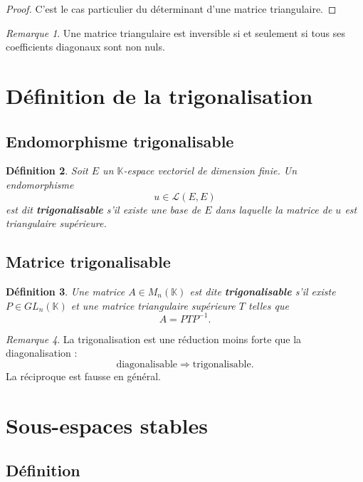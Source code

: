 \documentclass[11pt,a4paper]{article}
\newtheorem{definition}{Définition}[section]
\theoremstyle{remark}
\newtheorem{remarque}[definition]{Remarque}
\newcommand{\K}{\mathbb{K}}
\begin{document}
\begin{proof}
C’est le cas particulier du déterminant d’une matrice triangulaire.
\end{proof}

\begin{remarque}
Une matrice triangulaire est inversible si et seulement si tous ses coefficients diagonaux sont non nuls.
\end{remarque}

\section{Définition de la trigonalisation}

\subsection{Endomorphisme trigonalisable}

\begin{definition}
Soit \(E\) un \(\K\)-espace vectoriel de dimension finie.  
Un endomorphisme
\[
u\in\mathcal L(E,E)
\]
est dit \textbf{trigonalisable} s’il existe une base de \(E\) dans laquelle la matrice de \(u\) est triangulaire supérieure.
\end{definition}

\subsection{Matrice trigonalisable}

\begin{definition}
Une matrice \(A\in M_n(\K)\) est dite \textbf{trigonalisable} s’il existe \(P\in GL_n(\K)\) et une matrice triangulaire supérieure \(T\) telles que
\[
A=PTP^{-1}.
\]
\end{definition}

\begin{remarque}
La trigonalisation est une réduction moins forte que la diagonalisation :
\[
\text{diagonalisable} \Longrightarrow \text{trigonalisable}.
\]
La réciproque est fausse en général.
\end{remarque}

\section{Sous-espaces stables}

\subsection{Définition}
\end{document}
